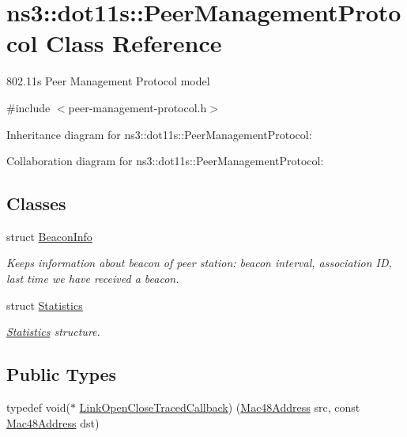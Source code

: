 \hypertarget{classns3_1_1dot11s_1_1PeerManagementProtocol}{}\section{ns3\+:\+:dot11s\+:\+:Peer\+Management\+Protocol Class Reference}
\label{classns3_1_1dot11s_1_1PeerManagementProtocol}


802.\+11s Peer Management Protocol model  




{\ttfamily \#include $<$peer-\/management-\/protocol.\+h$>$}



Inheritance diagram for ns3\+:\+:dot11s\+:\+:Peer\+Management\+Protocol\+:


Collaboration diagram for ns3\+:\+:dot11s\+:\+:Peer\+Management\+Protocol\+:
\subsection*{Classes}
\begin{DoxyCompactItemize}
\item 
struct \hyperlink{structns3_1_1dot11s_1_1PeerManagementProtocol_1_1BeaconInfo}{Beacon\+Info}
\begin{DoxyCompactList}\small\item\em Keeps information about beacon of peer station\+: beacon interval, association ID, last time we have received a beacon. \end{DoxyCompactList}\item 
struct \hyperlink{structns3_1_1dot11s_1_1PeerManagementProtocol_1_1Statistics}{Statistics}
\begin{DoxyCompactList}\small\item\em \hyperlink{structns3_1_1dot11s_1_1PeerManagementProtocol_1_1Statistics}{Statistics} structure. \end{DoxyCompactList}\end{DoxyCompactItemize}
\subsection*{Public Types}
\begin{DoxyCompactItemize}
\item 
typedef void($\ast$ \hyperlink{classns3_1_1dot11s_1_1PeerManagementProtocol_a30cfc4c8952a7313c342baee1a05668c}{Link\+Open\+Close\+Traced\+Callback}) (\hyperlink{classns3_1_1Mac48Address}{Mac48\+Address} src, const \hyperlink{classns3_1_1Mac48Address}{Mac48\+Address} dst)
\end{DoxyCompactItemize}

